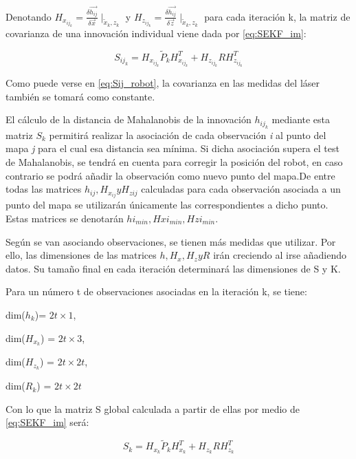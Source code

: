 Denotando $H_{x_{ij_{k}}} = \frac{\delta \vec{h_{ij}}}{\delta \vec{x}}\mid _{\tilde{x}_k,z_{k}}$ y $H_{z_{ij_{k}}} = \frac{\delta \vec{h_{ij}}}{\delta \vec{z}}\mid _{\tilde{x}_k,z_{k}}$ para cada iteración k, la matriz de covarianza de una innovación individual viene dada por \ref{eq:SEKF_im}:

\begin{equation}\label{eq:Sij_robot}
    S_{ij_{k}} = H_{x_{ij_{k}}}\tilde{P}_{k}H_{x_{ij_{k}}}^{T}+H_{z_{ij_{k}}}RH_{z_{ij_{k}}}^{T}
\end{equation}

Como puede verse en \ref{eq:Sij_robot}, la covarianza en las medidas del láser también se tomará como constante.

El cálculo de la distancia de Mahalanobis de la innovación $h_{ij_{k}}$ mediante esta matriz $S_{k}$ permitirá realizar la asociación de cada observación \emph{i} al punto del mapa \emph{j} para el cual esa distancia sea mínima. Si dicha asociación supera el test de Mahalanobis, se tendrá en cuenta para corregir la posición del robot, en caso contrario se podrá añadir la observación como nuevo punto del mapa.De entre todas las matrices $h_{ij}, H_{x_{ij}} y H_{z{ij}}$ calculadas para cada observación asociada a un punto del mapa se utilizarán únicamente las correspondientes a dicho punto. Estas matrices se denotarán $hi_{min}, Hxi_{min}, Hzi_{min}$.

Según se van asociando observaciones, se tienen más medidas que utilizar. Por ello, las dimensiones de las matrices $h, H_{x}, H_{z} y R$ irán creciendo al irse añadiendo datos. Su tamaño final en cada iteración determinará las dimensiones de S y K.

Para un número t de observaciones asociadas en la iteración k, se tiene:

\begin{center}
dim($h_{k}$)= $2t \times 1$,

dim($H_{x_{k}}$) = $2t \times 3$,

dim($H_{z_{k}}$) = $2t \times 2t$,

dim($R_{k}$) = $2t \times 2t$
\end{center}


Con lo que la matriz S global calculada a partir de ellas por medio de \ref{eq:SEKF_im} será:

\begin{equation}\label{eq:S_robot}
    S_{k} = H_{x_{k}}\tilde{P}_{k}H_{x_{k}}^{T}+H_{z_{k}}RH_{z_{k}}^{T}
\end{equation}

